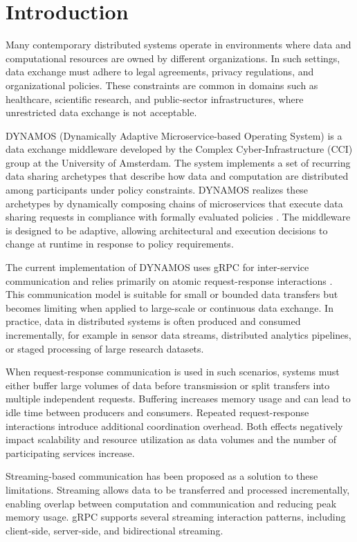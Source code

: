 \section{Introduction}

Many contemporary distributed systems operate in environments where data and computational resources are owned by different organizations. In such settings, data exchange must adhere to legal agreements, privacy regulations, and organizational policies. These constraints are common in domains such as healthcare, scientific research, and public-sector infrastructures, where unrestricted data exchange is not acceptable.

DYNAMOS (Dynamically Adaptive Microservice-based Operating System) is a data exchange middleware developed by the Complex Cyber-Infrastructure (CCI) group at the University of Amsterdam. The system implements a set of recurring data sharing archetypes that describe how data and computation are distributed among participants under policy constraints. DYNAMOS realizes these archetypes by dynamically composing chains of microservices that execute data sharing requests in compliance with formally evaluated policies \cite{stutterheim2023thesis,stutterheim2023icsa}. The middleware is designed to be adaptive, allowing architectural and execution decisions to change at runtime in response to policy requirements.

The current implementation of DYNAMOS uses gRPC for inter-service communication and relies primarily on atomic request-response interactions \cite{stutterheim2023thesis}. This communication model is suitable for small or bounded data transfers but becomes limiting when applied to large-scale or continuous data exchange. In practice, data in distributed systems is often produced and consumed incrementally, for example in sensor data streams, distributed analytics pipelines, or staged processing of large research datasets.

When request-response communication is used in such scenarios, systems must either buffer large volumes of data before transmission or split transfers into multiple independent requests. Buffering increases memory usage and can lead to idle time between producers and consumers. Repeated request-response interactions introduce additional coordination overhead. Both effects negatively impact scalability and resource utilization as data volumes and the number of participating services increase.

Streaming-based communication has been proposed as a solution to these limitations. Streaming allows data to be transferred and processed incrementally, enabling overlap between computation and communication and reducing peak memory usage. gRPC supports several streaming interaction patterns, including client-side, server-side, and bidirectional streaming.

